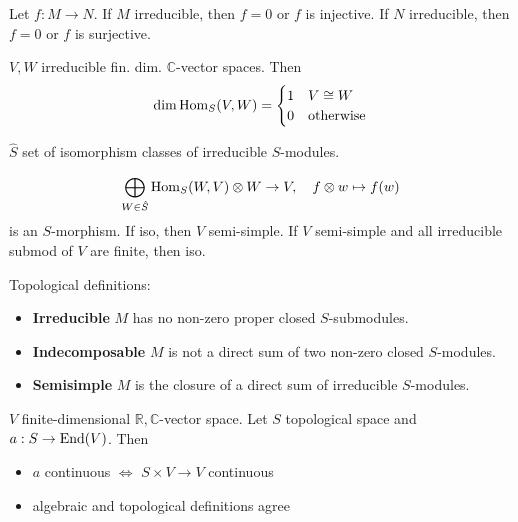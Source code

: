 \begin{proposition}
Let $f : M \to N$. If $M$ irreducible, then $f = 0$ or $f$ is injective. If $N$ irreducible, then $f = 0$ or $f$ is surjective.
\end{proposition}

\begin{proposition}  $V, W$ irreducible fin. dim. $\mathbb{C}$-vector spaces. Then
\[
\dim \operatorname{Hom}_S(V, W) = \begin{cases} 1 & V \cong W \\ 0 & \text{otherwise} \end{cases}    
\]
\end{proposition}

\begin{definition} $\hat{S}$ set of isomorphism classes of irreducible $S$-modules.
\end{definition}

\begin{proposition}
\[
\bigoplus_{W \in \hat{S}} \operatorname{Hom}_S(W, V) \otimes W \to V, \quad f \otimes w \mapsto f(w)
\]
is an $S$-morphism. If iso, then $V$ semi-simple. If $V$ semi-simple and all irreducible submod of $V$ are finite, then iso.
\end{proposition}

\begin{definition} Topological definitions:
\begin{itemize}[topsep=-6pt, itemsep=0pt]
    \item \textbf{Irreducible} $M$ has no non-zero proper closed $S$-submodules.
    \item \textbf{Indecomposable} $M$ is not a direct sum of two non-zero closed $S$-modules.
    \item \textbf{Semisimple} $M$ is the closure of a direct sum of irreducible $S$-modules.
\end{itemize}
\end{definition}

\begin{proposition} $V$ finite-dimensional $\mathbb{R}, \mathbb{C}$-vector space. Let $S$ topological space and $a : S \to \operatorname{End}(V)$. Then
\begin{itemize}[topsep=-6pt, itemsep=0pt]
    \item $a$ continuous $ \iff $ $S \times V \to V$ continuous
    \item algebraic and topological definitions agree
\end{itemize}
\end{proposition}

